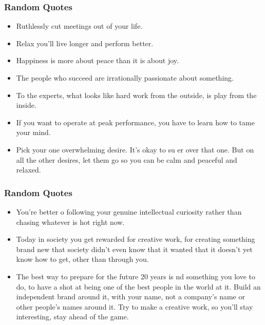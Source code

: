\begin{frame}[fragile]\frametitle{ Random Quotes}

\begin{itemize}
\item Ruthlessly cut meetings out of your life.
\item Relax you’ll live longer and perform better.
\item Happiness is more about peace than it is about joy.
\item The people who succeed are irrationally passionate about something.
\item To the experts, what looks like hard work from the outside, is play
from the inside.
\item If you want to operate at peak performance, you have to learn how to
tame your mind.
\item Pick your one overwhelming desire. It’s okay to su er over that one.
But on all the other desires, let them go so you can be calm and
peaceful and relaxed.
\end{itemize}

\end{frame}

\begin{frame}[fragile]\frametitle{ Random Quotes}

\begin{itemize}
\item You’re better o  following your genuine intellectual curiosity rather
than chasing whatever is hot right now.
\item Today in society you get rewarded for creative work, for creating
something brand new that society didn’t even know that it wanted
that it doesn’t yet know how to get, other than through you.

\item The best way to prepare for the future 20 years is  nd something you
love to do, to have a shot at being one of the best people in the world
at it. Build an independent brand around it, with your name, not a
company’s name or other people’s names around it. Try to make a
creative work, so you’ll stay interesting, stay ahead of the game.
\end{itemize}

\end{frame}

